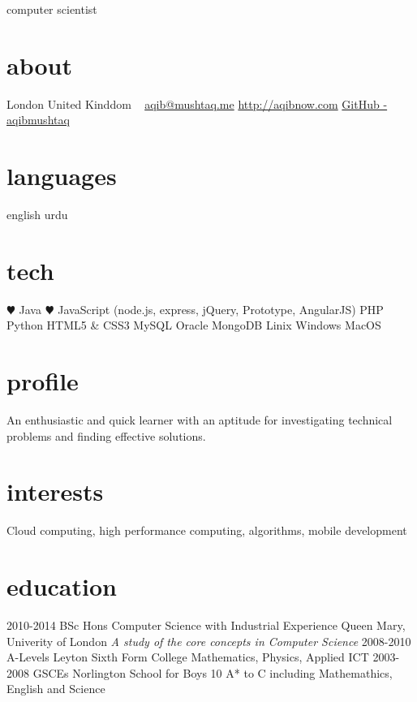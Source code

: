 \documentclass[]{friggeri-cv}
\begin{document}
       {computer scientist}


\begin{aside}
  \section{about}
    London
    United Kinddom
    ~
    \href{mailto:aqib@mushtaq.me}{aqib@mushtaq.me}
    \href{http://aqibnow.com}{http://aqibnow.com}
    \href{https://github.com/aqibmushtaq}{GitHub - aqibmushtaq}
  \section{languages}
    english
    urdu
  \section{tech}
    {\color{red} $\varheartsuit$} Java
    {\color{red} $\varheartsuit$} JavaScript
    (node.js, express, jQuery, Prototype, AngularJS)
    PHP
    Python
    HTML5 \& CSS3
    MySQL
    Oracle
    MongoDB
    Linix
    Windows
    MacOS
\end{aside}

\section{profile}

An enthusiastic and quick learner with an aptitude for investigating technical problems and finding effective solutions.

\section{interests}
Cloud computing, high performance computing, algorithms, mobile development

\section{education}

\begin{entrylist}
  \entry
    {2010-2014}
    {BSc Hons {\normalfont Computer Science with Industrial Experience}}
    {Queen Mary, Univerity of London}
    {\emph{A study of the core concepts in Computer Science}}
  \entry
    {2008-2010}
    {A-Levels}
    {Leyton Sixth Form College}
    {Mathematics, Physics, Applied ICT}
  \entry
    {2003-2008}
    {GSCEs}
    {Norlington School for Boys}
    {10 A* to C including Mathemathics, English and Science}
\end{entrylist}
\end{document}
